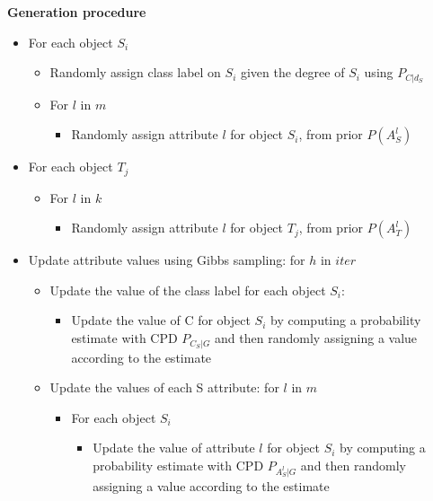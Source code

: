 \documentclass[11pt]{article}
\begin{document}
\vspace{5.mm}
\small{
\textbf{Generation procedure}
\vspace{-5.mm}
\begin{itemize}
\item For each object $S_i$
	\begin{itemize}
	\item Randomly assign class label on $S_i$ given 
	the degree of $S_i$ using $P_{C|d_S}$
	\item For $l$ in $m$
		\begin{itemize}
		\item Randomly assign attribute $l$ for object 
		$S_i$, from prior $P(A^l_S)$
		\end{itemize}
	\end{itemize}
\item For each object $T_j$
	\begin{itemize}
	\item For $l$ in $k$
		\begin{itemize}
		\item Randomly assign attribute $l$ for object 
		$T_j$, from prior $P(A^l_T)$
		\end{itemize}
	\end{itemize}
\item Update attribute values using Gibbs sampling: for $h$ in $iter$
	\begin{itemize}
	\item Update the value of the class label for each object $S_i$: 
		\begin{itemize}
			\item Update the value of C for object $S_i$
			by computing a probability estimate with CPD 
			$P_{C_S|G}$ and then randomly assigning a value 
			according to the estimate
		\end{itemize}
	\end{itemize}
	\begin{itemize}
	\item Update the values of each S attribute: for $l$ in $m$
		\begin{itemize}
		\item For each object $S_i$
			\begin{itemize}
			\item Update the value of attribute $l$ for object $S_i$
			by computing a probability estimate with CPD 
			$P_{A^l_S|G}$ and then randomly assigning a value 
			according to the estimate
			\end{itemize}
		\end{itemize}

\end{itemize}
\end{itemize}}
\end{document}
